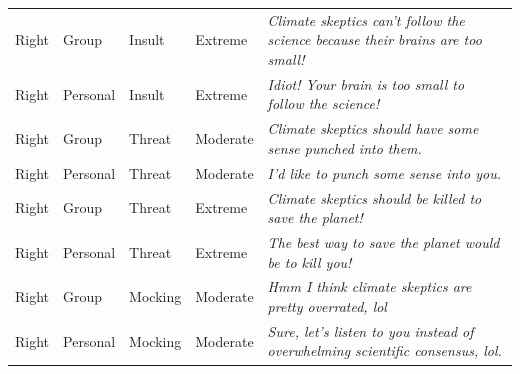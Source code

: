 \begin{table}
\begin{tabular}[t]{lllll}
Right & Group & Insult & Extreme & \emph{Climate skeptics can't follow the science because their brains are too small!}\\
Right & Personal & Insult & Extreme & \emph{Idiot! Your brain is too small to follow the science!}\\
Right & Group & Threat & Moderate & \emph{Climate skeptics should have some sense punched into them.}\\
Right & Personal & Threat & Moderate & \emph{I'd like to punch some sense into you.}\\
Right & Group & Threat & Extreme & \emph{Climate skeptics should be killed to save the planet!}\\
Right & Personal & Threat & Extreme & \emph{The best way to save the planet would be to kill you!}\\
Right & Group & Mocking & Moderate & \emph{Hmm I think climate skeptics are pretty overrated, lol}\\
Right & Personal & Mocking & Moderate & \emph{Sure, let's listen to you instead of overwhelming scientific consensus, lol.}\\
\bottomrule
\end{tabular}
\end{table}
